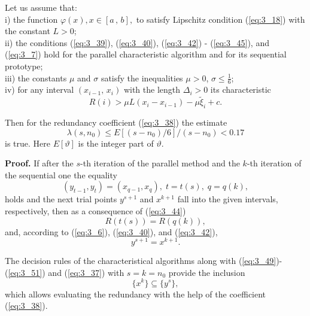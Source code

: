 	\begin{theorem} 
	\label{theor:3_5}
	Let us assume that: \\
	i) the function $\varphi (x),x\in [a\, ,\, b],$ to satisfy Lipschitz condition  (\ref{eq:3_18}) with the constant  $L>0$; \\
	ii) the conditions  (\ref{eq:3_39}),  (\ref{eq:3_40}),  (\ref{eq:3_42}) -  (\ref{eq:3_45}), and  (\ref{eq:3_7}) hold for the parallel characteristic algorithm and for its sequential prototype; \\	
	iii) the constants $\mu $ and $\sigma $ satisfy the inequalities $\mu >0$, $\sigma \le \frac{1}{6} $; \\
	iv) for any interval $(x_{i-1} ,\, x_i )$ with the length $\Delta _i >0$ its characteristic 
	\begin{equation}
	\label{eq:3_47}
	R(i)>\mu L(x_{i} -x_{i-1} )-\mu \tilde{\xi }_{i} +c.
	\end{equation}
	
	Then for the redundancy coefficient  (\ref{eq:3_38}) the estimate 
	\begin{equation} 
	\label{eq:3_48} 
	\lambda (s,n_{0} )\le E[(s-n_{0} )/6]/(s-n_{0} )<0.17 
	\end{equation} 
	is true. Here $E[\vartheta ]$ is the integer part of $\vartheta $.
	\end{theorem}
	\textbf{Proof.} If after the $s$-th iteration of the parallel method and the $k$-th iteration of the sequential one the equality 
	\begin{equation}
	\label{eq:3_49}
	(y_{t-1} ,y_{t} )=(x_{q-1} ,x_{q} ),\; t=t(s),\; q=q(k),
	\end{equation}
	holds and the next trial points $y^{s+1} $ and $x^{k+1} $ fall into the given intervals, respectively, then as a consequence of  (\ref{eq:3_44})
	\begin{equation}
	\label{eq:3_50}
	R(t(s))=R(q(k)),
	\end{equation}
	and, according to  (\ref{eq:3_6}),  (\ref{eq:3_40}), and  (\ref{eq:3_42}), 
	\begin{equation}
	\label{eq:3_51}
	y^{s+1} =x^{k+1}.
	\end{equation}
	
	The decision rules of the characteristical algorithms along with  (\ref{eq:3_49})- (\ref{eq:3_51}) and  (\ref{eq:3_37}) with $s=k=n_0 $ provide the inclusion
	\begin{equation*}
	\{ x^{k} \} \subseteq \{ y^{s} \},
	\end{equation*}
	which allows evaluating the redundancy with the help of the coefficient  (\ref{eq:3_38}).
	
